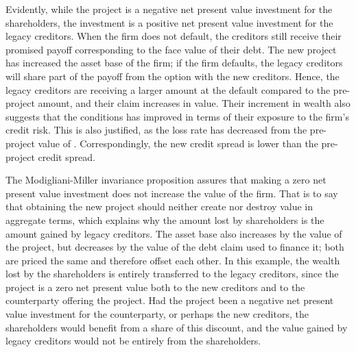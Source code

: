 \documentclass[main.tex]{subfiles}
\begin{document}
        Evidently, while the project is a negative net present value investment for the shareholders,
        the investment is a positive net present value investment for the legacy creditors.
        When the firm does not default, the creditors still receive their promised payoff 
        corresponding to the face value of their debt.
        The new project has increased the asset base of the firm; if the firm defaults, 
        the legacy creditors will share part of the payoff from the option with the new creditors.
        Hence, the legacy creditors are receiving a larger amount at the default compared to the pre-project amount, and their claim increases in value.
        Their increment in wealth also suggests that the conditions has improved in terms of their exposure to the firm's credit risk.
        This is also justified, as the loss rate has decreased from the pre-project value of .
        Correspondingly, the new credit spread is lower than the pre-project credit spread.

        The Modigliani-Miller invariance proposition assures that making a zero net present value investment 
        does not increase the value of the firm.
        That is to say that obtaining the new project should neither create nor destroy value in aggregate terms,
        which explains why the amount lost by shareholders is the amount gained by legacy creditors.
        The asset base also increases by the value of the project, 
        but decreases by the value of the debt claim used to finance it; 
        both are priced the same and therefore offset each other.
        In this example, the wealth lost by the shareholders is entirely transferred to the legacy creditors,
        since the project is a zero net present value both to the new creditors 
        and to the counterparty offering the project.
        Had the project been a negative net present value investment for the counterparty, 
        or perhaps the new creditors, the shareholders would benefit from a share of this discount,
        and the value gained by legacy creditors would not be entirely from the shareholders.
\end{document}
